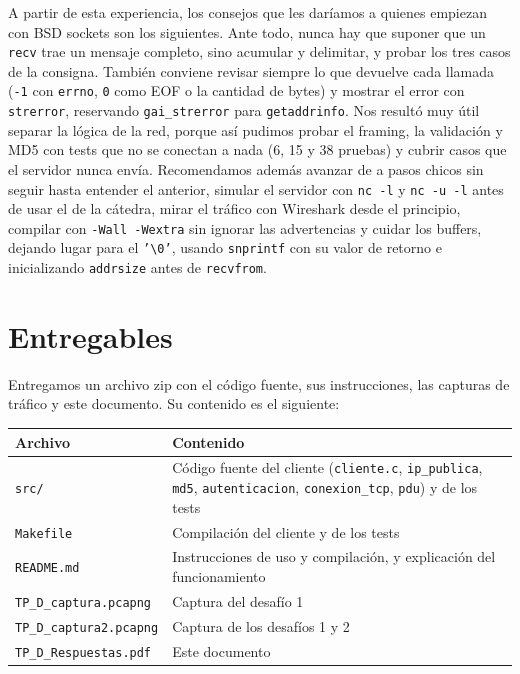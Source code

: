 \documentclass[11pt,a4paper]{article}
\newcommand{\code}[1]{\texttt{#1}}
\begin{document}
A partir de esta experiencia, los consejos que les daríamos a quienes empiezan con BSD sockets son los siguientes. Ante todo, nunca hay que suponer que un \code{recv} trae un mensaje completo, sino acumular y delimitar, y probar los tres casos de la consigna. También conviene revisar siempre lo que devuelve cada llamada (\code{-1} con \code{errno}, \code{0} como EOF o la cantidad de bytes) y mostrar el error con \code{strerror}, reservando \code{gai\_strerror} para \code{getaddrinfo}. Nos resultó muy útil separar la lógica de la red, porque así pudimos probar el framing, la validación y MD5 con tests que no se conectan a nada (6, 15 y 38 pruebas) y cubrir casos que el servidor nunca envía. Recomendamos además avanzar de a pasos chicos sin seguir hasta entender el anterior, simular el servidor con \code{nc -l} y \code{nc -u -l} antes de usar el de la cátedra, mirar el tráfico con Wireshark desde el principio, compilar con \code{-Wall -Wextra} sin ignorar las advertencias y cuidar los buffers, dejando lugar para el \code{'\textbackslash 0'}, usando \code{snprintf} con su valor de retorno e inicializando \code{addrsize} antes de \code{recvfrom}.

\section{Entregables}

Entregamos un archivo zip con el código fuente, sus instrucciones, las capturas de tráfico y este documento. Su contenido es el siguiente:

\begin{center}
\begin{tabularx}{0.9\textwidth}{@{}l X@{}}
\toprule
Archivo & Contenido \\
\midrule
\code{src/} & Código fuente del cliente (\code{cliente.c}, \code{ip\_publica}, \code{md5}, \code{autenticacion}, \code{conexion\_tcp}, \code{pdu}) y de los tests \\
\code{Makefile} & Compilación del cliente y de los tests \\
\code{README.md} & Instrucciones de uso y compilación, y explicación del funcionamiento \\
\code{TP\_D\_captura.pcapng} & Captura del desafío 1 \\
\code{TP\_D\_captura2.pcapng} & Captura de los desafíos 1 y 2 \\
\code{TP\_D\_Respuestas.pdf} & Este documento \\
\bottomrule
\end{tabularx}
\end{center}
\end{document}
